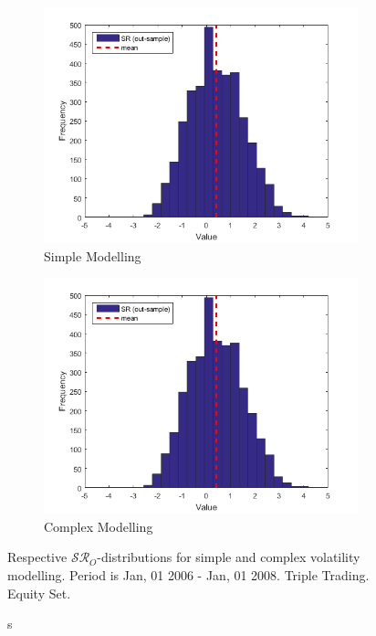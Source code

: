 \documentclass[11pt,a4,twosided,singlespacing,titlepagenumber=on]{scrreprt}
\numberwithin{equation}{chapter} %
\theoremstyle{remark}
\begin{document}
\begin{figure}[H]
    \centering
    \begin{subfigure}[t]{0.49\textwidth}
        \centering
        \includegraphics[width=1\textwidth]{res/params/5845_6575/sr}
        \caption{Simple Modelling}
    \end{subfigure}
    \begin{subfigure}[t]{0.49\textwidth}
        \centering
        \includegraphics[width=1\textwidth]{res/params/5845_6575/sr}
        \caption{Complex Modelling}
    \end{subfigure}
    \caption[]s{Respective $\mathcal{SR}_O$-distributions for simple and complex volatility modelling. Period is Jan, 01 2006 - Jan, 01 2008. Triple Trading. Equity Set.}
    \label{fig:sharpe_ratio_comparison}
\end{figure}
\end{document}
